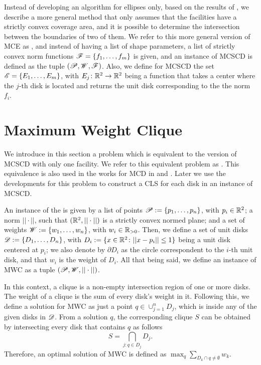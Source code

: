Instead of developing an algorithm for ellipses only, based on the results of , we describe a more general method that only assumes that the facilities have a strictly convex coverage area, and it is possible to determine the intersection between the boundaries of two of them.
We refer to this more general version of MCE as , and instead of having a list of shape parameters, a list of strictly convex norm functions $\mathscr{F}=\{f_1, \dots, f_m\}$ is given, and an instance of MCSCD is defined as the tuple $(\mathscr{P}, \mathscr{W}, \mathscr{F})$. Also, we define for MCSCD the set $\mathscr{E}=\{E_1, \dots, E_m\}$, with $E_j\colon \mathbb{R}^2 \to \mathbb{R}^2$ being a function that takes a center where the $j$-th disk is located and returns the unit disk corresponding to the the norm $f_i$.

\section{Maximum Weight Clique}

We introduce in this section a problem which is equivalent to the version of MCSCD with only one facility. We refer to this equivalent problem as . This equivalence is also used in the works for MCD in  and . Later we use the developments for this problem to construct a CLS for each disk in an instance of MCSCD.

An instance of the  is given by a list of points \mbox{$\mathscr{P}:=\{p_1,\dots,p_n\}$}, with $p_i \in \mathbb{R}^2$; 
a norm $||\cdot||$, such that $(\mathbb{R}^2, ||\cdot||)$ is a strictly convex normed plane; and a set of weights \mbox{$\mathscr{W}:=\{w_1, \dots, w_n\}$}, with $w_i\in \mathbb{R}_{>0}$. 
Then, we define a set of unit disks $\mathscr{D}:=\{D_1, \dots, D_n\}$, with $D_i:=\{x \in \mathbb{R}^2 \colon ||x-p_i|| \le 1\}$ being a unit disk centered at $p_i$; we also denote by $\partial D_i$ as the circle correspondent to the $i$-th unit disk, and that $w_i$ is the weight of $D_i$.
All that being said, we define an instance of MWC as a tuple $(\mathscr{P}, \mathscr{W}, ||\cdot||)$.

In this context, a clique is a non-empty intersection region of one or more disks. The weight of a clique is the sum of every disk's weight in it.
Following this, we define a solution for MWC as just a point $q\in\cup_{j=1}^n D_j$, which is inside any of the given disks in $\mathscr{D}$.
From a solution $q$, the corresponding clique $S$ can be obtained by intersecting every disk that contains $q$ as follows
\begin{equation*}
	S = \bigcap_{j : q \in D_j} D_j.
\end{equation*}
Therefore, an optimal solution of MWC is defined as	$\max_{q} \sum_{D_k \cap q \neq \emptyset} w_k$.


